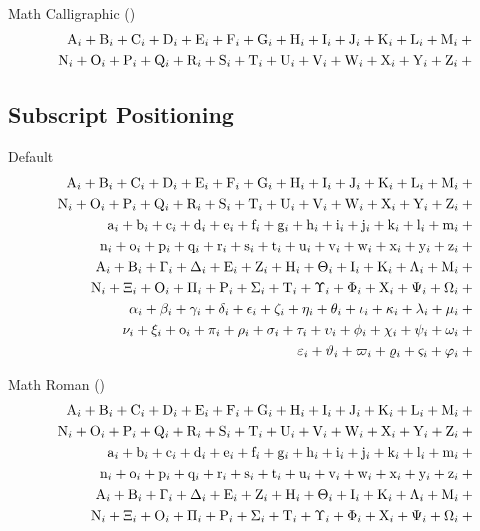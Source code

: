 \documentclass[12pt, a4paper, oneside]{article}
\theoremstyle{Plain}
\theoremstyle{Definition}
\theoremstyle{Remark}
\begin{document}
\begin{appendix}
Math Calligraphic (\texttt{\string\mathcal})
\def\test#1{\mathcal{#1}^{2}+{}}%
\begin{eqnarray*}
  && {\testupperi}\\
  && {\testupperii}
\end{eqnarray*}%


\subsection{Subscript Positioning \showfamily}

Default
\def\test#1{\mathnormal{#1}_{i}+{}}%
\begin{eqnarray*}
  && {\testupperi}\\
  && {\testupperii}\\
  && {\testloweri}\\
  && {\testlowerii}\\
  && {\testupgreeki}\\
  && {\testupgreekii}\\
  && {\testlowgreeki}\\
  && {\testlowgreekii}\\
  && {\testlowgreekiii}
\end{eqnarray*}%

Math Roman (\texttt{\string\mathrm})
\def\test#1{\mathrm{#1}_{i}+{}}%
\begin{eqnarray*}
  && {\testupperi}\\
  && {\testupperii}\\
  && {\testloweri}\\
  && {\testlowerii}\\
  && {\testupgreeki}\\
  && {\testupgreekii}
\end{eqnarray*}%



\end{appendix}
\end{document}
